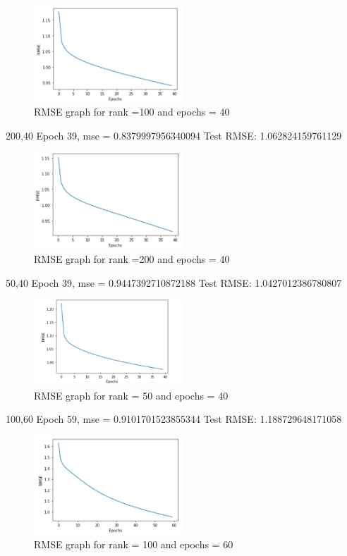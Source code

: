 \documentclass[final]{cvpr}
\begin{document}
\begin{figure}[h]
	\includegraphics[width=0.5\textwidth]{./100_40_graph.PNG}
	\caption{RMSE graph for rank =100 and epochs = 40}
\end{figure}

200,40
Epoch 39, mse = 0.8379997956340094
Test RMSE: 1.062824159761129

\begin{figure}[h]
	\includegraphics[width=0.5\textwidth]{./200_40_graph.PNG}
	\caption{RMSE graph for rank =200 and epochs = 40}
\end{figure}

50,40
Epoch 39, mse = 0.9447392710872188
Test RMSE: 1.0427012386780807

\begin{figure}[h]
	\includegraphics[width=0.5\textwidth]{./50_40_graph.PNG}
	\caption{RMSE graph for rank = 50 and epochs = 40}
\end{figure}

100,60
Epoch 59, mse = 0.9101701523855344
Test RMSE: 1.188729648171058

\begin{figure}[h]
	\includegraphics[width=0.5\textwidth]{./100_60_graph.PNG}
	\caption{RMSE graph for rank = 100 and epochs = 60}
\end{figure}
\end{document}
